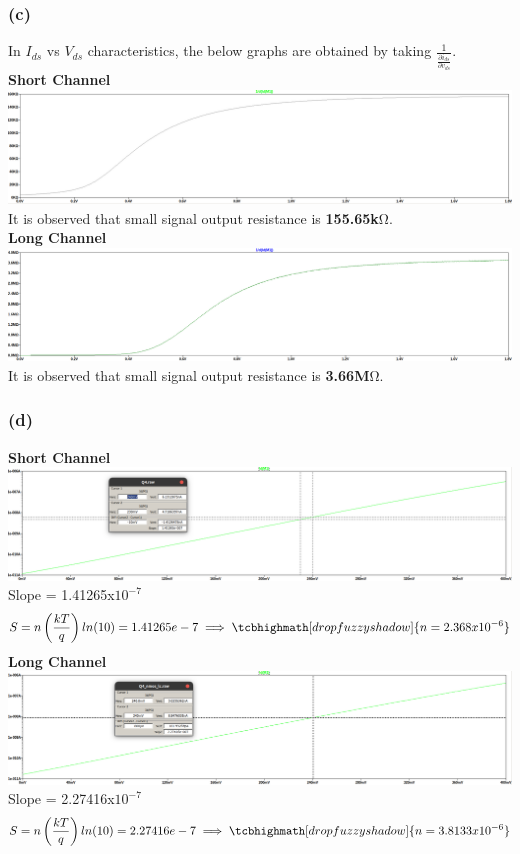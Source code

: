 \documentclass{article}
\begin{document}
\subsubsection*{(c)}
In $I_{ds}$ vs $V_{ds}$ characteristics, the below graphs are obtained by taking $\frac{1}{\frac{\partial i_{ds}}{\partial v_{ds}}}$.\\
\textbf{Short Channel}\\
\includegraphics[scale=0.28]{./figs/Q4_nmos_sc_c.png}\\
It is observed that small signal output resistance is \textbf{155.65k$\si{\ohm}$}.\\
 \newline
\textbf{Long Channel}\\
\includegraphics[scale=0.28]{./figs/Q4_nmos_lc_c.png}\\
It is observed that small signal output resistance is \textbf{3.66M$\si{\ohm}$}.

\subsubsection*{(d)}
\textbf{Short Channel}\\
\includegraphics[scale=0.28]{./figs/Q4_b_sc_st.png}\\
Slope = 1.41265x$10^{-7}$
\begin{gather*}
S = n\left(\frac{kT}{q}\right)ln(10) = 1.41265e-7
\implies \tcbhighmath[drop fuzzy shadow]{n = 2.368x10^{-6}}
\end{gather*}
 \newline
\textbf{Long Channel}\\
\includegraphics[scale=0.28]{./figs/Q4_b_nmos_lc_vgs_st.png}
Slope = 2.27416x$10^{-7}$
\begin{gather*}
S = n\left(\frac{kT}{q}\right)ln(10) = 2.27416e-7
\implies \tcbhighmath[drop fuzzy shadow]{n = 3.8133x10^{-6}}
\end{gather*}	
\end{document}
